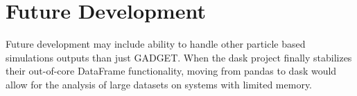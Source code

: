 \section{Future Development}
\label{sec:future}
Future development may include ability to handle other particle based simulations outputs than just GADGET.  When the dask project finally stabilizes their out-of-core DataFrame functionality, moving from pandas to dask would allow for the analysis of large datasets on systems with limited memory.